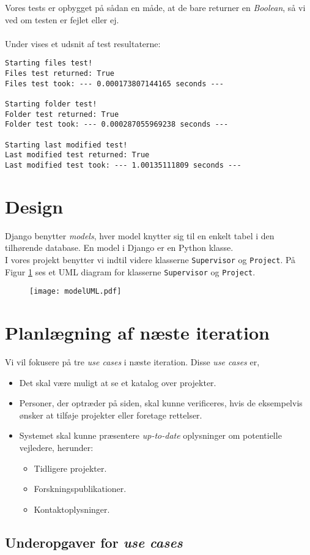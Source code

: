 \documentclass[11pt]{article}
\begin{document}
Vores tests er opbygget på sådan en måde, at de bare returner en \textit{Boolean}, så vi ved om testen er fejlet eller ej. \\ \\
Under vises et udsnit af test resultaterne:
\begin{lstlisting}
Starting files test!
Files test returned: True
Files test took: --- 0.000173807144165 seconds ---

Starting folder test!
Folder test returned: True
Folder test took: --- 0.000287055969238 seconds ---

Starting last modified test!
Last modified test returned: True
Last modified test took: --- 1.00135111809 seconds ---
\end{lstlisting}




\section{Design}
Django benytter \textit{models}, hver model knytter sig til en enkelt tabel i den tilhørende database. En model i Django er en Python klasse. \\ I vores projekt benytter vi indtil videre klasserne \texttt{Supervisor} og \texttt{Project}. På Figur \ref{fig:modelUML} ses et UML diagram for klasserne \texttt{Supervisor} og \texttt{Project}.


\begin{figure}
			\centering
			\texttt{[image: modelUML.pdf]}
			\caption{}
			\label{fig:modelUML}
\end{figure}



\section{Planlægning af næste iteration}
Vi vil fokusere på tre \textit{use cases} i næste iteration. Disse \textit{use cases} er,
\begin{itemize}
	\item Det skal være muligt at se et katalog over projekter.
	\item Personer, der optræder på siden, skal kunne verificeres, hvis de eksempelvis ønsker at tilføje projekter eller foretage rettelser.
	\item Systemet skal kunne præsentere \textit{up-to-date} oplysninger om potentielle vejledere, herunder:
	\begin{itemize}
		\item Tidligere projekter.
		\item Forskningspublikationer.
		\item Kontaktoplysninger.
	\end{itemize}
\end{itemize}

\subsection{Underopgaver for \textit{use cases}}
\end{document}
